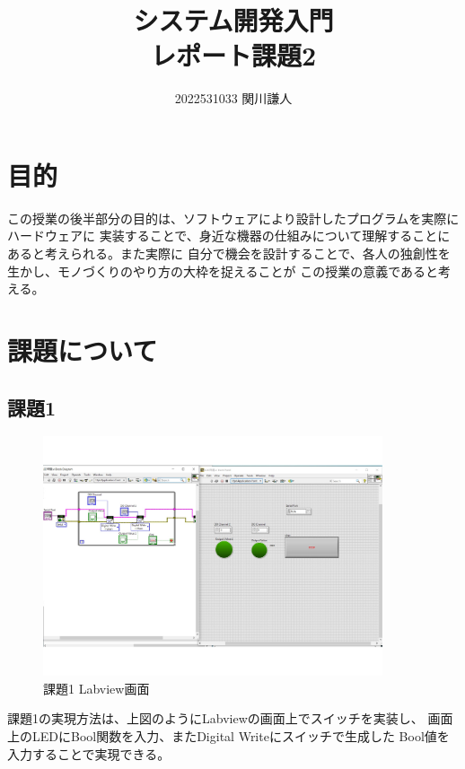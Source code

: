 \documentclass[a4paper,titlepage,11pt]{ltjsarticle}
\begin{document}
\title{システム開発入門\\レポート課題2}
\author{2022531033 関川謙人}
\maketitle

\section{目的}
この授業の後半部分の目的は、ソフトウェアにより設計したプログラムを実際にハードウェアに
実装することで、身近な機器の仕組みについて理解することにあると考えられる。また実際に
自分で機会を設計することで、各人の独創性を生かし、モノづくりのやり方の大枠を捉えることが
この授業の意義であると考える。
\section{課題について}
\subsection{課題1}
\begin{figure}[H]
  \begin{center}
    \includegraphics[width=100mm]{kadai1.pdf}
    \caption{課題1 Labview画面}
  \end{center}
\end{figure}
課題1の実現方法は、上図のようにLabviewの画面上でスイッチを実装し、
画面上のLEDにBool関数を入力、またDigital Writeにスイッチで生成した
Bool値を入力することで実現できる。
\end{document}
